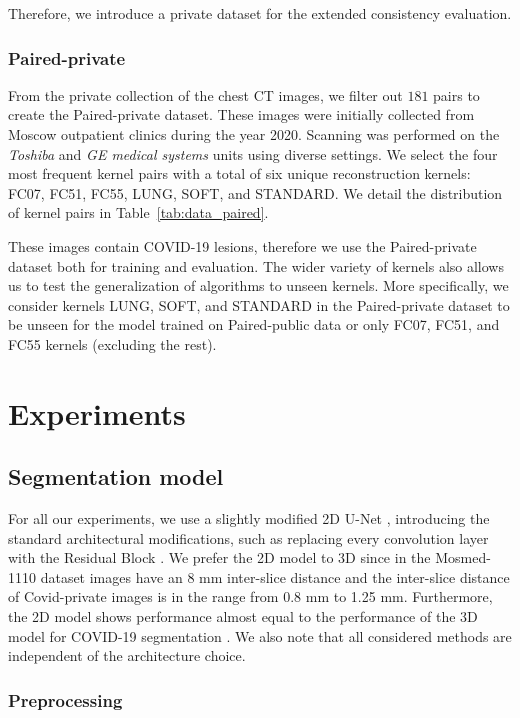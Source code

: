 Therefore, we introduce a private dataset for the extended consistency evaluation.


\subsubsection{Paired-private}

From the private collection of the chest CT images, we filter out $181$ pairs to create the Paired-private dataset. These images were initially collected from Moscow outpatient clinics during the year 2020. Scanning was performed on the \textit{Toshiba} and \textit{GE medical systems} units using diverse settings. We select the four most frequent kernel pairs with a total of six unique reconstruction kernels: FC07, FC51, FC55, LUNG, SOFT, and STANDARD. We detail the distribution of kernel pairs in Table~\ref{tab:data_paired}.

These images contain COVID-19 lesions, therefore we use the Paired-private dataset both for training and evaluation. The wider variety of kernels also allows us to test the generalization of algorithms to unseen kernels. More specifically, we consider kernels LUNG, SOFT, and STANDARD in the Paired-private dataset to be unseen for the model trained on Paired-public data or only FC07, FC51, and FC55 kernels (excluding the rest).


\section{Experiments}

\subsection{Segmentation model}

For all our experiments, we use a  slightly modified 2D U-Net \cite{ronneberger2015u}, introducing the standard architectural modifications, such as replacing every convolution layer with the Residual Block \cite{he2016deep}. We prefer the 2D model to 3D since in the Mosmed-1110 dataset images have an 8 mm inter-slice distance and the inter-slice distance of Covid-private images is in the range from 0.8 mm to 1.25 mm. Furthermore, the 2D model shows performance almost equal to the performance of the 3D model for COVID-19 segmentation \cite{goncharov2021ct}. We also note that all considered methods are independent of the architecture choice.

\subsubsection{Preprocessing}


